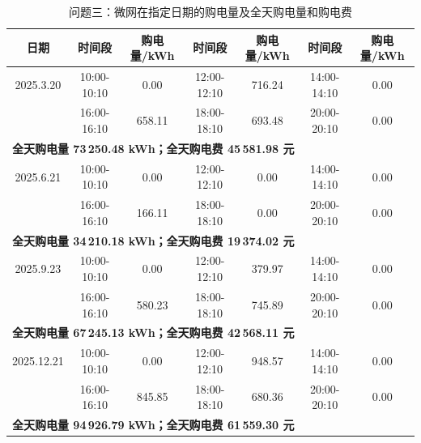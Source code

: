 \documentclass[withoutpreface]{cumcmthesis}
\newcommand{\hd}[1]{\textbf{#1}}
\begin{document}
\begin{table}[!htbp]
  \centering
  \caption{问题三：微网在指定日期的购电量及全天购电量和购电费}
  \label{tab:q3t1}
  \begin{tabular}{c c c c c c c}
    \toprule[1.5pt]
    \hd{日期} & \hd{时间段} & \hd{购电量/kWh} & \hd{时间段} & \hd{购电量/kWh} & \hd{时间段} & \hd{购电量/kWh}\\
    \midrule[1pt]
2025.3.20 & 10:00-10:10 & 0.00 & 12:00-12:10 & 716.24 & 14:00-14:10 & 0.00\\
 & 16:00-16:10 & 658.11 & 18:00-18:10 & 693.48 & 20:00-20:10 & 0.00\\
\multicolumn{6}{l}{\hd{全天购电量 73\,250.48 kWh；全天购电费 45\,581.98 元}}\\
\midrule[1pt]
2025.6.21 & 10:00-10:10 & 0.00 & 12:00-12:10 & 0.00 & 14:00-14:10 & 0.00\\
 & 16:00-16:10 & 166.11 & 18:00-18:10 & 0.00 & 20:00-20:10 & 0.00\\
\multicolumn{6}{l}{\hd{全天购电量 34\,210.18 kWh；全天购电费 19\,374.02 元}}\\
\midrule[1pt]
2025.9.23 & 10:00-10:10 & 0.00 & 12:00-12:10 & 379.97 & 14:00-14:10 & 0.00\\
 & 16:00-16:10 & 580.23 & 18:00-18:10 & 745.89 & 20:00-20:10 & 0.00\\
\multicolumn{6}{l}{\hd{全天购电量 67\,245.13 kWh；全天购电费 42\,568.11 元}}\\
\midrule[1pt]
2025.12.21 & 10:00-10:10 & 0.00 & 12:00-12:10 & 948.57 & 14:00-14:10 & 0.00\\
 & 16:00-16:10 & 845.85 & 18:00-18:10 & 680.36 & 20:00-20:10 & 0.00\\
\multicolumn{6}{l}{\hd{全天购电量 94\,926.79 kWh；全天购电费 61\,559.30 元}}\\
    \bottomrule[1.5pt]
  \end{tabular}
\end{table}
\end{document}
